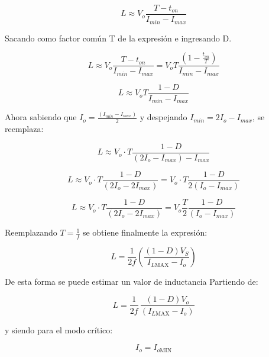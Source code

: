 \documentclass[]{article}
\begin{document}
	\begin{equation}
		L \approx V_o  \frac{  T - t_{on}}{ {I_{min}} - {I_{max}} }
	\end{equation} 
	
	Sacando como factor común T de la expresión e ingresando D.
	
	\begin{equation}
		L \approx V_o  \frac{  T - t_{on}}{ {I_{min}} - {I_{max}} } =  V_o  T \frac{  (1 - \frac{t_{on}}{T})}{ {I_{min}} - {I_{max}} } 
	\end{equation} 
	
	
	\begin{equation}
		L \approx  V_o  T \frac{  1 - D} {   I_{min} - {I_{max}}    } 
	\end{equation} 
	
	Ahora sabiendo que $I_o = \frac{(I_{min} - I_{max})}{2}$ y despejando $ I_{min} = 2I_o - I_{max}$, se reemplaza:
	
	\begin{equation}
		L \approx  V_o \cdot T \frac{  1 - D} {   (2I_o - I_{max}) - {I_{max}}    } 
	\end{equation} 
	
	
	\begin{equation}
		L \approx  V_o \cdot T \frac{  1 - D} {   (2I_o - 2I_{max})   }  = V_o \cdot T \frac{  1 - D} {   2(I_o - I_{max})   }
	\end{equation} 
	
	
	
	\begin{equation}
		L \approx  V_o \cdot T \frac{  1 - D} {   (2I_o - 2I_{max})   }  = V_o  \frac{T}{2} \frac{  1 - D} {   (I_o - I_{max})   }
	\end{equation} 
	
	Reemplazando $T = \frac{1}{f}$ se obtiene finalmente la expresión:
	
	\begin{equation}
		L =
		\frac{1}{2f}
		\left(
		\frac{(1-D)V_S}{I_{L\text{MAX}} - I_o}
		\right)
	\end{equation}
	
	De esta forma se puede estimar un valor de inductancia 
	Partiendo de:
	
	\begin{equation}
		L = \frac{1}{2f}\,\frac{(1-D)V_o}{(I_{L\text{MAX}} - I_o)}
	\end{equation}
	
	y siendo para el modo crítico:
	
	\begin{equation}
		I_o = I_{o\text{MIN}}
	\end{equation}
	
\end{document}
